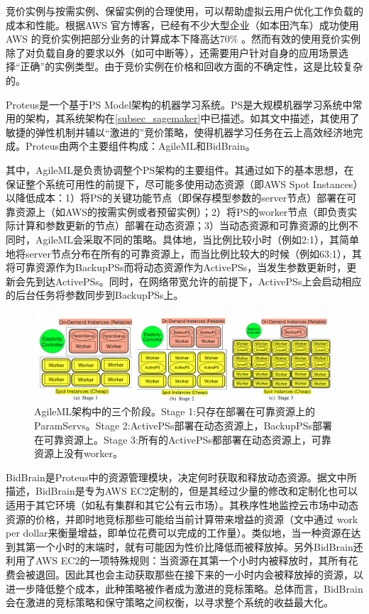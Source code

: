 竞价实例与按需实例、保留实例的合理使用，可以帮助虚拟云用户优化工作负载的成本和性能。根据AWS 官方博客，已经有不少大型企业（如本田汽车）成功使用AWS 的竞价实例把部分业务的计算成本下降高达70\% 。然而有效的使用竞价实例除了对负载自身的要求以外（如可中断等），还需要用户针对自身的应用场景选择“正确”的实例类型。由于竞价实例在价格和回收方面的不确定性，这是比较复杂的。

Proteus\parencite{harlap2017proteus}是一个基于PS Model架构的机器学习系统。PS是大规模机器学习系统中常用的架构，其系统架构在\ref{subsec_sagemaker}中已描述。如其文中描述，其使用了敏捷的弹性机制并辅以“激进的”竞价策略，使得机器学习任务在云上高效经济地完成。Proteus由两个主要组件构成：AgileML和BidBrain。

其中，AgileML是负责协调整个PS架构的主要组件。其通过如下的基本思想，在保证整个系统可用性的前提下，尽可能多使用动态资源（即AWS Spot Instances）以降低成本：1）将PS的关键功能节点（即保存模型参数的server节点）部署在可靠资源上（如AWS的按需实例或者预留实例）；2）将PS的worker节点（即负责实际计算和参数更新的节点）部署在动态资源；3）当动态资源和可靠资源的比例不同时，AgileML会采取不同的策略。具体地，当比例比较小时（例如2:1），其简单地将server节点分布在所有的可靠资源上，而当比例比较大的时候（例如63:1），其将可靠资源作为BackupPSs而将动态资源作为ActivePSs，当发生参数更新时，更新会先到达ActivePSs。同时，在网络带宽允许的前提下，ActivePSs上会启动相应的后台任务将参数同步到BackupPSs上。

\begin{figure}[h]
    \centerline{\includegraphics[width=\textwidth]{figures/agileml-stages.png}}
    \caption{AgileML架构中的三个阶段。Stage 1:只存在部署在可靠资源上的ParamServs。Stage 2:ActivePSs部署在动态资源上，BackupPSs部署在可靠资源上。Stage 3:所有的ActivePSs都部署在动态资源上，可靠资源上没有worker。}
    \label{agileml_stages}
\end{figure}

BidBrain是Proteus中的资源管理模块，决定何时获取和释放动态资源。据文中所描述，BidBrain是专为AWS EC2定制的，但是其经过少量的修改和定制化也可以适用于其它环境（如私有集群和其它公有云市场）。其秩序性地监控云市场中动态资源的价格，并即时地竞标那些可能给当前计算带来增益的资源（文中通过 work per dollar来衡量增益，即单位花费可以完成的工作量）。类似地，当一种资源在达到其第一个小时的末端时，就有可能因为性价比降低而被释放掉。另外BidBrain还利用了AWS EC2的一项特殊规则：当资源在其第一个小时内被释放时，其所有花费会被退回。因此其也会主动获取那些在接下来的一小时内会被释放掉的资源，以进一步降低整个成本，此种策略被作者成为激进的竞标策略。总体而言，BidBrain会在激进的竞标策略和保守策略之间权衡，以寻求整个系统的收益最大化。

